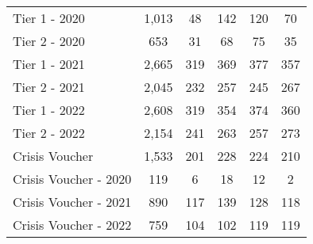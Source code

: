 \begin{tabular}{l|c|c|c|c|c}
\midrule 
\quad Tier 1 - 2020 & 1,013 & 48 & 142 & 120 & 70 \\
\quad Tier 2 - 2020 & 653 & 31 & 68 & 75 & 35 \\
\quad Tier 1 - 2021 & 2,665 & 319 & 369 & 377 & 357 \\
\quad Tier 2 - 2021 & 2,045 & 232 & 257 & 245 & 267 \\
\quad Tier 1 - 2022 & 2,608 & 319 & 354 & 374 & 360 \\
\quad Tier 2 - 2022 & 2,154 & 241 & 263 & 257 & 273 \\
\midrule 
Crisis Voucher & 1,533 & 201 & 228 & 224 & 210 \\
\quad Crisis Voucher - 2020 & 119 & 6 & 18 & 12 & 2 \\
\quad Crisis Voucher - 2021 & 890 & 117 & 139 & 128 & 118 \\
\quad Crisis Voucher - 2022 & 759 & 104 & 102 & 119 & 119 \\
\midrule 
\bottomrule 
\end{tabular}
